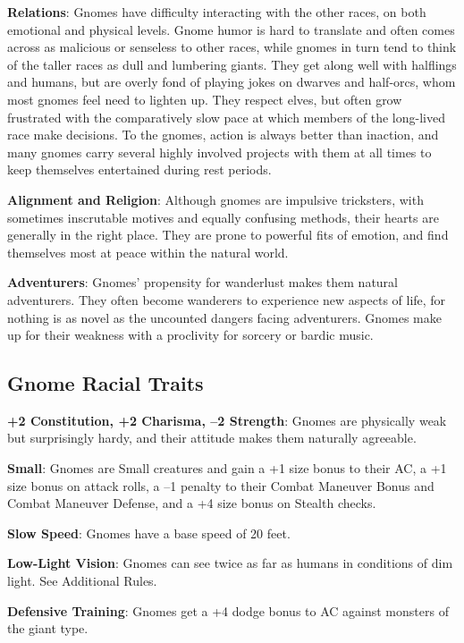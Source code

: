\textbf{Relations}: Gnomes have difficulty interacting with the other races, on both emotional and physical levels. Gnome humor is hard to translate and often comes across as malicious or senseless to other races, while gnomes in turn tend to think of the taller races as dull and lumbering giants. They get along well with halflings and humans, but are overly fond of playing jokes on dwarves and half-orcs, whom most gnomes feel need to lighten up. They respect elves, but often grow frustrated with the comparatively slow pace at which members of the long-lived race make decisions. To the gnomes, action is always better than inaction, and many gnomes carry several highly involved projects with them at all times to keep themselves entertained during rest periods.
				
\textbf{Alignment and Religion}: Although gnomes are impulsive tricksters, with sometimes inscrutable motives and equally confusing methods, their hearts are generally in the right place. They are prone to powerful fits of emotion, and find themselves most at peace within the natural world.
				
\textbf{Adventurers}: Gnomes' propensity for wanderlust makes them natural adventurers. They often become wanderers to experience new aspects of life, for nothing is as novel as the uncounted dangers facing adventurers. Gnomes make up for their weakness with a proclivity for sorcery or bardic music.
							
\subsection{Gnome Racial Traits}

				
\textbf{+2 Constitution, +2 Charisma, --2 Strength}: Gnomes are physically weak but surprisingly hardy, and their attitude makes them naturally agreeable.
				
\textbf{Small}: Gnomes are Small creatures and gain a +1 size bonus to their AC, a +1 size bonus on attack rolls, a --1 penalty to their Combat Maneuver Bonus and Combat Maneuver Defense, and a +4 size bonus on Stealth checks.
				
\textbf{Slow Speed}: Gnomes have a base speed of 20 feet.
				
\textbf{Low-Light Vision}: Gnomes can see twice as far as humans in conditions of dim light. See Additional Rules.
				
\textbf{Defensive Training}: Gnomes get a +4 dodge bonus to AC against monsters of the giant type.
				
